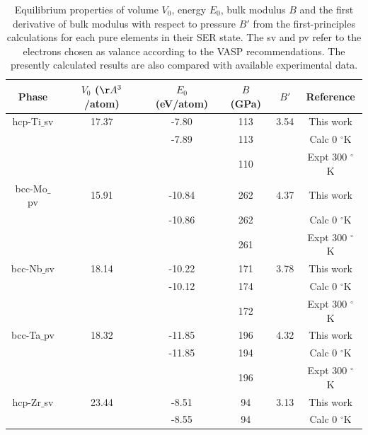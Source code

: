\newpage
\begin{table}[H]
	\caption{Equilibrium properties of volume $V_{0}$, energy $E_{0}$, bulk modulus $B$ and the first derivative of bulk modulus with respect to pressure $B'$ from the first-principles calculations for each pure elements in their SER state. The sv and pv refer to the electrons chosen as valance according to the VASP recommendations. The presently calculated results are also compared with available experimental data.}
	\centering
	\begin{tabular}{ c c c c c c }
		\hline
		Phase & $V_{0}$ ($\AA^{3}$/atom) & $E_{0}$ (eV/atom) & $B$ (GPa) & $B'$ & Reference \\
		\hline
		hcp-Ti$\_$sv & 17.37 & -7.80 & 113 & 3.54 & This work\\
                 & & -7.89 & 113 & & Calc 0 $^{\circ}$K \cite{Schmitz-Pranghe1968_792,MaterialsProject}\\
                 & & & 110 & & Expt 300 $^{\circ}$K \cite{WolframResearch}\\
        bcc-Mo$\_$pv & 15.91 & -10.84 & 262 & 4.37 & This work\\
                 & & -10.86 & 262 & & Calc 0 $^{\circ}$K \cite{MaterialsProject,Chen_Y2009_794}\\        
                 & & & 261 & & Expt 300 $^{\circ}$K \cite{Bolef1961}\\
        bcc-Nb$\_$sv & 18.14 & -10.22 & 171 & 3.78 & This work\\
                 & & -10.12 & 174 & & Calc 0 $^{\circ}$K \cite{MaterialsProject,Neuburger1936_127}\\           
                 & & & 172 & & Expt 300 $^{\circ}$K \cite{Bolef1961} \\
        bcc-Ta$\_$pv & 18.32 & -11.85 & 196 & 4.32 & This work\\
                 & & -11.85 & 194 & & Calc 0 $^{\circ}$K \cite{MaterialsProject,Neuburger1936_262}\\
                 & & & 196 & & Expt 300 $^{\circ}$K \cite{Bolef1961}\\                     
        hcp-Zr$\_$sv & 23.44& -8.51 & 94 & 3.13 & This work\\
                 & & -8.55 & 94 & & Calc 0 $^{\circ}$K \cite{MaterialsProject,Treco1953_964,Bergerhoff1983,Karlsruhe}\\
		\hline
	\end{tabular}
	\label{Ch3-table:pspureele}
\end{table}

